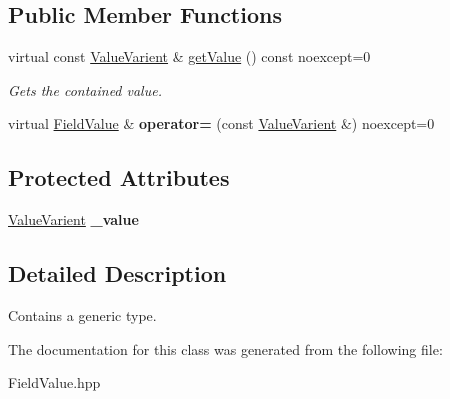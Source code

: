 \subsection*{Public Member Functions}
\begin{DoxyCompactItemize}
\item 
\mbox{\label{classZiApi_1_1FieldValue_ae142783211fc0a6dc13e8820c48bb57c}} 
virtual const \mbox{\hyperlink{classZiApi_1_1FieldValue_ad15b3d7fad80efab396843e70a5b1db2}{Value\+Varient}} \& \mbox{\hyperlink{classZiApi_1_1FieldValue_ae142783211fc0a6dc13e8820c48bb57c}{get\+Value}} () const noexcept=0
\begin{DoxyCompactList}\small\item\em Gets the contained value. \end{DoxyCompactList}\item 
\mbox{\label{classZiApi_1_1FieldValue_a78c42c7b9b8e87fb62ca5c1631837a30}} 
virtual \mbox{\hyperlink{classZiApi_1_1FieldValue}{Field\+Value}} \& {\bfseries operator=} (const \mbox{\hyperlink{classZiApi_1_1FieldValue_ad15b3d7fad80efab396843e70a5b1db2}{Value\+Varient}} \&) noexcept=0
\end{DoxyCompactItemize}
\subsection*{Protected Attributes}
\begin{DoxyCompactItemize}
\item 
\mbox{\label{classZiApi_1_1FieldValue_af89df27595513c982d191d0a84b8f12c}} 
\mbox{\hyperlink{classZiApi_1_1FieldValue_ad15b3d7fad80efab396843e70a5b1db2}{Value\+Varient}} {\bfseries \+\_\+value}
\end{DoxyCompactItemize}


\subsection{Detailed Description}
Contains a generic type. 

The documentation for this class was generated from the following file\+:\begin{DoxyCompactItemize}
\item 
Field\+Value.\+hpp\end{DoxyCompactItemize}
